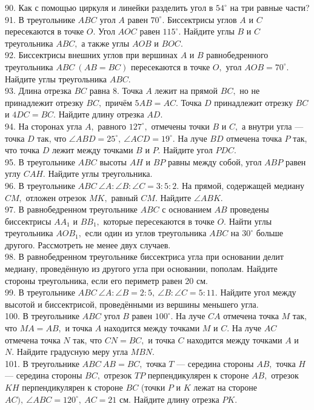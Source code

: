 \documentclass[12pt]{article}
\begin{document}
90. Как с помощью циркуля и линейки разделить угол в $54^\circ$ на три равные части?\\
91. В треугольнике $ABC$ угол $A$ равен $70^\circ.$ Биссектрисы углов $A$ и $C$ пересекаются в точке $O.$ Угол $AOC$ равен $115^\circ.$ Найдите углы $B$ и $C$ треугольника $ABC,$ а также углы $AOB$ и $BOC.$\\
92. Биссектрисы внешних углов при вершинах $A$ и $B$ равнобедренного треугольника $ABC\ (AB=BC)$ пересекаются в точке $O,$ угол $AOB=70^\circ.$ Найдите углы треугольника $ABC.$\\
93. Длина отрезка $BC$ равна 8. Точка $A$ лежит на прямой $BC,$ но не принадлежит отрезку $BC,$ причём $5AB=AC.$ Точка $D$ принадлежит отрезку $BC$ и $4DC=BC.$ Найдите длину отрезка $AD.$\\
94. На сторонах угла $A,$ равного $127^\circ,$ отмечены точки $B$ и $C,$ а внутри угла --- точка $D$ так, что $\angle ABD=25^\circ,\ \angle ACD=19^\circ.$ На луче $BD$ отмечена точка $P$ так, что точка $D$ лежит между точками $B$ и $P.$ Найдите угол $PDC.$\\
95. В треугольнике $ABC$ высоты $AH$ и $BP$ равны между собой, угол $ABP$ равен углу $CAH.$ Найдите углы треугольника.\\
96. В треугольнике $ABC\ \angle A: \angle B: \angle C=3:5:2.$ На прямой, содержащей медиану $CM,$ отложен отрезок $MK,$ равный $CM.$ Найдите $\angle ABK.$\\
97. В равнобедренном треугольнике $ABC$ с основанием $AB$ проведены биссектрисы $AA_1$ и $BB_1,$ которые пересекаются в точке $O.$ Найти углы треугольника $AOB_1,$ если один из углов треугольника $ABC$ на $30^\circ$ больше другого. Рассмотреть не менее двух случаев.\\
98. В равнобедренном треугольнике биссектриса угла при основании делит медиану, проведённую из другого угла при основании, пополам. Найдите стороны треугольника, если его периметр равен 20 см.\\
99. В треугольнике $ABC\ \angle A: \angle B=2:5,\ \angle B: \angle C=5:11.$ Найдите угол между высотой и биссектрисой, проведёнными из вершины меньшего угла.\\
100. В треугольнике $ABC$ угол $B$ равен $100^\circ.$ На луче $CA$ отмечена точка $M$ так, что $MA=AB,$ и точка $A$ находится между точками $M$ и $C.$ На луче $AC$ отмечена точка $N$ так, что $CN=BC,$ и точка $C$ находится между точками $A$ и $N.$ Найдите градусную меру угла $MBN.$\\
101. В треугольнике $ABC\ AB=BC,$ точка $T$ --- середина стороны $AB,$ точка $H$ --- середина стороны $BC,$ отрезок $TP$ перпендикулярен к стороне $AB,$ отрезок $KH$ перпендикулярен к стороне $BC$ (точки $P$ и $K$ лежат на стороне $AC),\ \angle ABC=120^\circ,\ AC=21$ см. Найдите длину отрезка $PK.$\\
\end{document}
